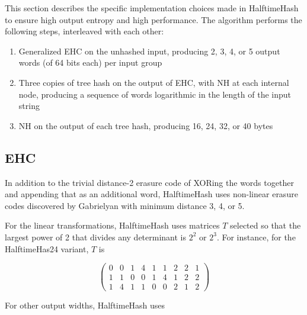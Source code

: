 \documentclass[runningheads]{llncs}
\begin{document}
This section describes the specific implementation choices made in HalftimeHash to ensure high output entropy and high performance.
The algorithm performs the following steps, interleaved with each other:

\begin{enumerate}
\item Generalized EHC on the unhashed input, producing 2, 3, 4, or 5 output words (of 64 bits each) per input group
\item Three copies of tree hash on the output of EHC, with NH at each internal node, producing a sequence of words logarithmic in the length of the input string
\item NH on the output of each tree hash, producing 16, 24, 32, or 40 bytes
\end{enumerate}

\subsection{EHC}

In addition to the trivial distance-2 erasure code of XORing the words together and appending that as an additional word, HalftimeHash uses non-linear erasure codes discovered by Gab\-ri\-el\-yan with minimum distance 3, 4, or 5. \cite{9-7-erasure-code,10-7-erasure-code,9-5-erasure-code}

For the linear transformations, HalftimeHash uses matrices $T$ selected so that the largest power of 2 that divides any determinant is $2^2$ or $2^3$.
For instance, for the HalftimeHas24 variant, $T$ is

\begin{displaymath}
  \left(
\begin{array}{rrrrrrrrr}
  0 & 0 & 1 & 4 & 1 & 1 & 2 & 2 & 1\\
  1 & 1 & 0 & 0 & 1 & 4 & 1 & 2 & 2\\
  1 & 4 & 1 & 1 & 0 & 0 & 2 & 1 & 2
\end{array}
\right)
\end{displaymath}

For other output widths, HalftimeHash uses
\end{document}
